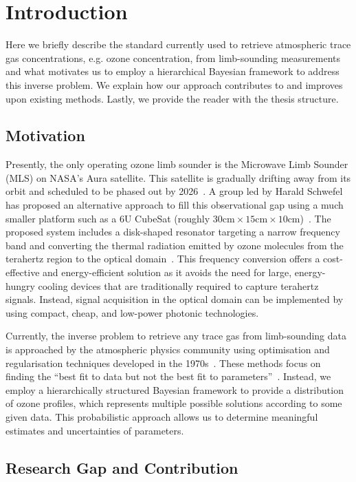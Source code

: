 \chapter{Introduction}
\thispagestyle{empty}
Here we briefly describe the standard currently used to retrieve atmospheric trace gas concentrations, e.g. ozone concentration, from limb-sounding measurements and what motivates us to employ a hierarchical Bayesian framework to address this inverse problem.
We explain how our approach contributes to and improves upon existing methods.
Lastly, we provide the reader with the thesis structure.


\section{Motivation}
Presently, the only operating ozone limb sounder is the Microwave Limb Sounder (MLS) on NASA's Aura satellite.
This satellite is gradually drifting away from its orbit and scheduled to be phased out by 2026~\cite{Bryan2024NASA}.
A group led by Harald Schwefel has proposed an alternative approach to fill this observational gap using a much smaller platform such as a 6U CubeSat (roughly $30\text{cm} \times 15\text{cm} \times 10\text{cm}$)~\cite{ustin2024current}. 
The proposed system includes a disk-shaped resonator targeting a narrow frequency band and converting the thermal radiation emitted by ozone molecules from the terahertz region to the optical domain~\cite{Suresh25,Sedlmeir14}. 
This frequency conversion offers a cost-effective and energy-efficient solution as it avoids the need for large, energy-hungry cooling devices that are traditionally required to capture terahertz signals. 
Instead, signal acquisition in the optical domain can be implemented by using compact, cheap, and low-power photonic technologies.

Currently, the inverse problem to retrieve any trace gas from limb-sounding data is approached by the atmospheric physics community using optimisation and regularisation techniques developed in the 1970s~\cite{rodgers1976retrieval, NASA2022MLSv5}.
These methods focus on finding the ``best fit to data but not the best fit to parameters''~\cite{tan2016LecNot}.
Instead, we employ a hierarchically structured Bayesian framework to provide a distribution of ozone profiles, which represents multiple possible solutions according to some given data.
This probabilistic approach allows us to determine meaningful estimates and uncertainties of parameters.

\section{Research Gap and Contribution}

